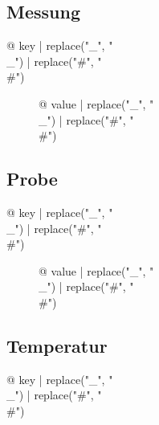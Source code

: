 \subsection{Messung}

\begin{description}
\item[{@ key | replace("_", "\\_") | replace("#", "\\#") }] {@ value | replace("_", "\\_") | replace("#", "\\#") }
\end{description}

\subsection{Probe}

\begin{description}
\item[{@ key | replace("_", "\\_") | replace("#", "\\#") }] {@ value | replace("_", "\\_") | replace("#", "\\#") }
\end{description}

\subsection{Temperatur}

\begin{description}
\item[{@ key | replace("_", "\\_") | replace("#", "\\#") }] %

\end{description}
